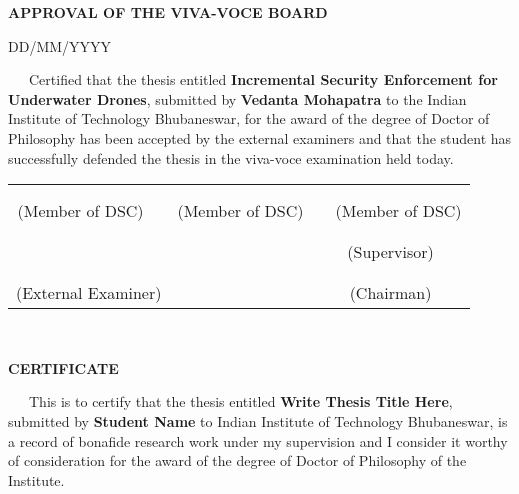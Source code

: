 \thispagestyle{empty}
\begin{center}
	\textbf{\Large APPROVAL OF THE VIVA-VOCE BOARD}
\end{center}
\begin{flushright}
	DD/MM/YYYY
\end{flushright}
~~~Certified that the thesis entitled  \textbf{Incremental Security Enforcement for Underwater Drones}, submitted by \textbf{Vedanta Mohapatra} to the Indian Institute of Technology  Bhubaneswar, for the award of the degree of Doctor of Philosophy has been accepted by the external examiners and that the student has successfully defended the thesis in the viva-voce examination held today.
\begin{center}
	\begin{tabular*}{\textwidth}{@{\extracolsep{\fill}}cccccccc}
		&&&&&&&\\
		&&&&&&&\\
		\multicolumn{2}{c}{(Member of DSC)} && \multicolumn{2}{c}{(Member of DSC)} && \multicolumn{2}{c}{(Member of DSC)}\\
		&&&&&&&\\
		&&&&&&&\\
		\multicolumn{3}{c}{} &&& \multicolumn{3}{c}{(Supervisor)}\\
		&&&&&&&\\
		&&&&&&&\\
		\multicolumn{3}{c}{(External Examiner)} &&& \multicolumn{3}{c}{(Chairman)}\\
	\end{tabular*}
\end{center}

\newpage

\thispagestyle{empty}
{~} %
\vspace{10em} %
\begin{center}
	\textbf{\Large CERTIFICATE}
\end{center}
~~~This is to certify that the thesis entitled  \textbf{Write Thesis Title Here}, submitted by \textbf{Student Name} to Indian Institute of Technology  Bhubaneswar, is a record of bonafide research work under my supervision and I consider it worthy of consideration for the award of the degree of Doctor of Philosophy of the Institute.

